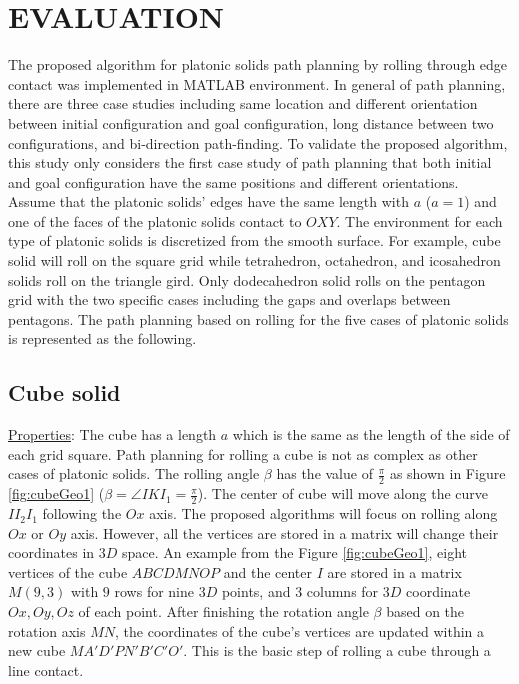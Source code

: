 \section{EVALUATION}
\label{sec:eva}
The proposed algorithm for platonic solids path planning by rolling through edge contact was implemented in MATLAB environment. 
In general of path planning, there are three case studies including same location and different orientation between initial configuration and goal configuration, long distance between two configurations, and bi-direction path-finding. 
To validate the proposed algorithm, this study only considers the first case study of path planning that both initial and goal configuration have the same positions and different orientations.\\  

\noindent Assume that the platonic solids' edges have the same length with $a$ ($a=1$) and one of the faces of the platonic solids contact to $OXY$. 
The environment for each type of platonic solids is discretized from the smooth surface. 
For example, cube solid will roll on the square grid while tetrahedron, octahedron, and icosahedron solids roll on the triangle gird. 
Only dodecahedron solid rolls on the pentagon grid with the two specific cases including the gaps and overlaps between pentagons. 
The path planning based on rolling for the five cases of platonic solids is represented as the following. 

\subsection{Cube solid}
\noindent\uline{Properties}:
The cube has a length $a$ which is the same as the length of the side of each grid square.
Path planning for rolling a cube is not as complex as other cases of platonic solids. 
The rolling angle $\beta$ has the value of $\frac{\pi}{2}$ as shown in Figure \ref{fig:cubeGeo1} ($\beta=\angle{IKI_1}=\frac{\pi}{2}$). 
The center of cube will move along the curve $II_2I_1$ following the $Ox$ axis. 
The proposed algorithms will focus on rolling along $Ox$ or $Oy$ axis. 
However, all the vertices are stored in a matrix will change their coordinates in $3D$ space. 
An example from the Figure \ref{fig:cubeGeo1}, eight vertices of the cube $ABCDMNOP$ and the center $I$ are stored in a matrix $M(9,3)$ with $9$ rows for nine $3D$ points, and $3$ columns for $3D$ coordinate $Ox,Oy,Oz$ of each point. 
After finishing the rotation angle $\beta$ based on the rotation axis $MN$, the coordinates of the cube's vertices are updated within a new cube $MA'D'PN'B'C'O'$. 
This is the basic step of rolling a cube through a line contact.

